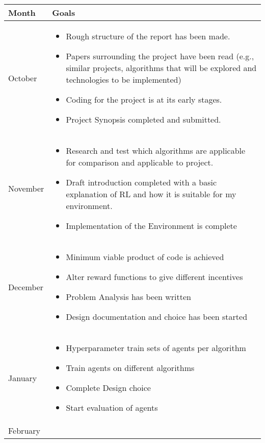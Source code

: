 \documentclass{surrey_disso_style}
\begin{document}
\begin{center}
\begin{tabular}{|p{1.6cm}|p{13cm}|}
   \hline
   \textbf{   Month} & \textbf{Goals}\\
   \hline
   October & \begin{itemize}
      \item Rough structure of the report has been made. 
      \item Papers surrounding the project have been read (e.g., similar projects, algorithms that will be explored and technologies to be implemented)
      \item Coding for the project is at its early stages.
      \item Project Synopsis completed and submitted.
   \end{itemize} \\
   \hline
   November & 
      \begin{itemize}
      \item Research and test which algorithms are applicable for comparison and applicable to project.
      \item Draft introduction completed with a basic explanation of RL and how it is suitable for my environment.
      \item Implementation of the Environment is complete
      \end{itemize}\\
   \hline
   December & \begin{itemize}
      \item Minimum viable product of code is achieved
      \item Alter reward functions to give different incentives
      \item Problem Analysis has been written
      \item Design documentation and choice has been started
   \end{itemize}\\
   \hline
   January & \begin{itemize}
      \item Hyperparameter train sets of agents per algorithm
      \item Train agents on different algorithms 
      \item Complete Design choice 
      \item Start evaluation of agents
   \end{itemize}\\
   \hline
   February & \begin{itemize}

\end{itemize}
\end{tabular}
\end{center}
\end{document}
